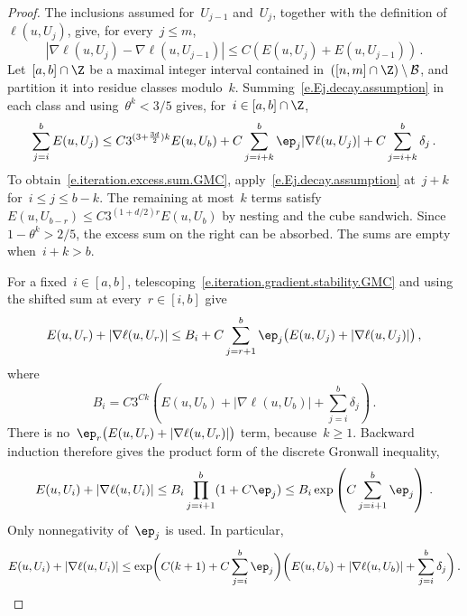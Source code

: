 \documentclass[11pt]{amsart}
\begin{document}
\begin{proof}
The inclusions assumed for~$U_{j-1}$ and~$U_j$, together with the definition of~$\ell(u,U_j)$, give, for every~$j\leq m$,
\begin{equation}
	|\nabla\ell(u,U_j)-\nabla\ell(u,U_{j-1})|
	\leq C(E(u,U_j)+E(u,U_{j-1}))\,.
	\label{e.iteration.gradient.stability.GMC}
\end{equation}
Let~$[a,b]\cap\Z$ be a maximal integer interval contained in~$([n,m]\cap\Z)\setminus\mathcal B$, and partition it into residue classes modulo~$k$. Summing~\eqref{e.Ej.decay.assumption} in each class and using~$\theta^k<3/5$ gives, for~$i\in[a,b]\cap\Z$,
\begin{equation}
	\sum_{j=i}^{b}E(u,U_j)
	\leq C3^{(3+\frac{3d}{2})k}E(u,U_b)
	+C\sum_{j=i+k}^{b}\ep_j|\nabla\ell(u,U_j)|
	+C\sum_{j=i+k}^{b}\delta_j\,.
	\label{e.iteration.excess.sum.GMC}
\end{equation}
To obtain~\eqref{e.iteration.excess.sum.GMC}, apply~\eqref{e.Ej.decay.assumption} at~$j+k$ for~$i\leq j\leq b-k$. The remaining at most~$k$ terms satisfy~$E(u,U_{b-r})\leq C3^{(1+d/2)r}E(u,U_b)$ by nesting and the cube sandwich. Since~$1-\theta^k>2/5$, the excess sum on the right can be absorbed. The sums are empty when~$i+k>b$.

\smallskip

For a fixed~$i\in[a,b]$, telescoping~\eqref{e.iteration.gradient.stability.GMC} and using the shifted sum at every~$r\in[i,b]$ give
\begin{equation*}
	E(u,U_r)+|\nabla\ell(u,U_r)|\leq B_i+C\sum_{j=r+1}^b\ep_j\bigl(E(u,U_j)+|\nabla\ell(u,U_j)|\bigr)\,,
\end{equation*}
where
\begin{equation*}
	B_i=C3^{Ck}\left(E(u,U_b)+|\nabla\ell(u,U_b)|+\sum_{j=i}^b\delta_j\right)\,.
\end{equation*}
There is no~$\ep_r\bigl(E(u,U_r)+|\nabla\ell(u,U_r)|\bigr)$ term, because~$k\geq1$. Backward induction therefore gives the product form of the discrete Gronwall inequality,
\begin{equation*}
	E(u,U_i)+|\nabla\ell(u,U_i)|\leq B_i\prod_{j=i+1}^b(1+C\ep_j)
	\leq B_i\exp\left(C\sum_{j=i+1}^b\ep_j\right)\,.
\end{equation*}
Only nonnegativity of~$\ep_j$ is used. In particular,
\begin{equation}
	E(u,U_i)+|\nabla\ell(u,U_i)|
	\leq
	\exp\biggl(C(k+1)+C\sum_{j=i}^{b}\ep_j\biggr)
	\biggl(E(u,U_b)+|\nabla\ell(u,U_b)|+\sum_{j=i}^{b}\delta_j\biggr)\,.
	\label{e.iteration.interval.GMC}
\end{equation}


\end{proof}
\end{document}
